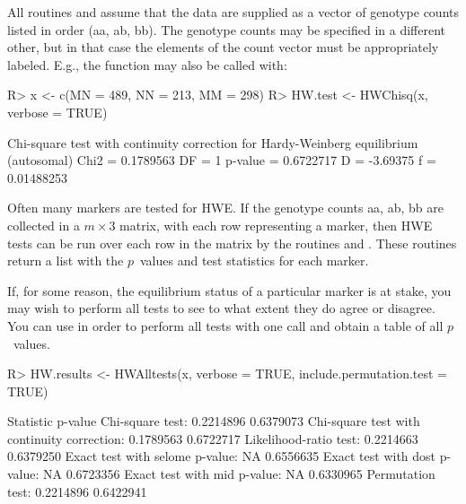 \documentclass[nojss]{jss}
\begin{document}
All routines  and  assume that
the data are supplied as a vector of genotype counts listed in order
({\sc aa, ab, bb}). The genotype counts may be specified in a
different other, but in that case the elements of the count vector
must be appropriately labeled. E.g., the  function may
also be called with:
%
\begin{Schunk}
\begin{Sinput}
R> x <- c(MN = 489, NN = 213, MM = 298)
R> HW.test <- HWChisq(x, verbose = TRUE)
\end{Sinput}
\begin{Soutput}
Chi-square test with continuity correction for Hardy-Weinberg equilibrium (autosomal)
Chi2 =  0.1789563 DF =  1 p-value =  0.6722717 D =  -3.69375 f =  0.01488253 
\end{Soutput}
\end{Schunk}

%
Often many markers are tested for HWE. If the genotype counts {\sc aa,
  ab, bb} are collected in a $m \times 3$ matrix, with each row
representing a marker, then HWE tests can be run over each row in the
matrix by the routines  and . These
routines return a list with the $p$~values and
test statistics for each marker.

If, for some reason, the equilibrium status of a particular marker is
at stake, you may wish to perform all tests to see to what extent they
do agree or disagree. You can use  in order to
perform all tests with one call and obtain a table of all $p$~values.
%


\begin{Schunk}
\begin{Sinput}
R> HW.results <- HWAlltests(x, verbose = TRUE, include.permutation.test = TRUE)
\end{Sinput}
\begin{Soutput}
                                            Statistic   p-value
Chi-square test:                            0.2214896 0.6379073
Chi-square test with continuity correction: 0.1789563 0.6722717
Likelihood-ratio test:                      0.2214663 0.6379250
Exact test with selome p-value:                    NA 0.6556635
Exact test with dost p-value:                      NA 0.6723356
Exact test with mid p-value:                       NA 0.6330965
Permutation test:                           0.2214896 0.6422941
\end{Soutput}
\end{Schunk}
\end{document}

